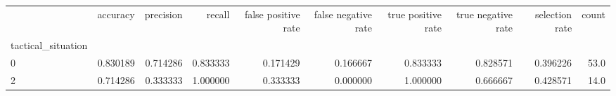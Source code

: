 \begin{tabular}{lrrrrrrrrr}
\toprule
{} &  accuracy &  precision &    recall &  false positive rate &  false negative rate &  true positive rate &  true negative rate &  selection rate &  count \\
tactical\_situation &           &            &           &                      &                      &                     &                     &                 &        \\
\midrule
0                  &  0.830189 &   0.714286 &  0.833333 &             0.171429 &             0.166667 &            0.833333 &            0.828571 &        0.396226 &   53.0 \\
2                  &  0.714286 &   0.333333 &  1.000000 &             0.333333 &             0.000000 &            1.000000 &            0.666667 &        0.428571 &   14.0 \\
\bottomrule
\end{tabular}
